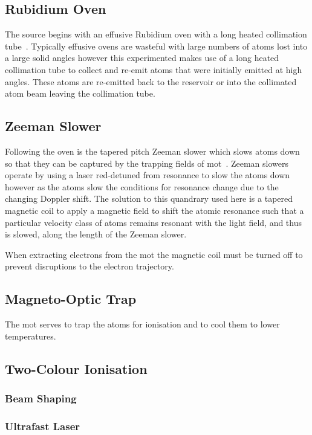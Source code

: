 \subsection{Rubidium Oven}
The source begins with an effusive Rubidium oven with a long heated collimation tube~\cite{bell_slow_2010}.
Typically effusive ovens are wasteful with large numbers of atoms lost into a large solid angles however this experimented makes use of a long heated collimation tube to collect and re-emit atoms that were initially emitted at high angles.
These atoms are re-emitted back to the reservoir or into the collimated atom beam leaving the collimation tube.

\subsection{Zeeman Slower}
Following the oven is the tapered pitch Zeeman slower which slows atoms down so that they can be captured by the trapping fields of \gls{mot}~\cite{bell_slow_2010}.
Zeeman slowers operate by using a laser red-detuned from resonance to slow the atoms down however as the atoms slow the conditions for resonance change due to the changing Doppler shift.
The solution to this quandrary used here is a tapered magnetic coil to apply a magnetic field to shift the atomic resonance such that a particular velocity class of atoms remains resonant with the light field, and thus is slowed, along the length of the Zeeman slower.

When extracting electrons from the \gls{mot} the magnetic coil must be turned off to prevent disruptions to the electron trajectory.

\subsection{Magneto-Optic Trap}
The \gls{mot} serves to trap the atoms for ionisation and to cool them to lower temperatures.

\subsection{Two-Colour Ionisation}

\subsubsection{Beam Shaping}

\subsubsection{Ultrafast Laser}

